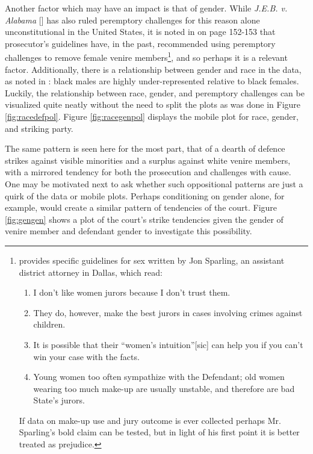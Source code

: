 Another factor which may have an impact is that of gender. While \textit{J.E.B. v. Alabama} [\cite{jebvalabama}] has also ruled
peremptory challenges for this reason alone unconstitutional in the United States, it is noted in \cite{vandykejurysel} on page
152-153 that prosecutor's guidelines have, in the past, recommended using peremptory challenges to remove female venire
members\footnote{\citeauthor{vandykejurysel} provides specific guidelines for sex written by Jon Sparling, an assistant district
  attorney in Dallas, which read: \begin{enumerate} 
  \item I don't like women jurors because I don't trust them.
  \item They do, however, make the best jurors in cases involving crimes against children.
  \item It is possible that their ``women's intuition''[sic] can help you if you can't win your case with the facts.
  \item Young women too often sympathize with the Defendant; old women wearing too much make-up are usually unstable, and
    therefore are bad State's jurors.
  \end{enumerate}
  If data on make-up use and jury outcome is ever collected perhaps Mr. Sparling's bold claim can be tested, but in light of
  his first point it is better treated as prejudice.}, and so perhaps it is a relevant factor. Additionally, there is a
relationship between gender and race in the data, as noted in \cite{JurySunshineProj}: black males are highly under-represented
relative to black females. Luckily, the relationship between race, gender, and peremptory challenges can be visualized quite
neatly without the need to split the plots as was done in Figure \ref{fig:racedefpol}. Figure \ref{fig:racegenpol} displays the
mobile plot for race, gender, and striking party.

The same pattern is seen here for the most part, that of a dearth of defence strikes against visible minorities and a surplus
against white venire members, with a mirrored tendency for both the prosecution and challenges with cause. One may be motivated
next to ask whether such oppositional patterns are just a quirk of the data or mobile plots. Perhaps conditioning on gender
alone, for example, would create a similar pattern of tendencies of the court. Figure \ref{fig:gengen} shows a plot of the court's
strike tendencies given the gender of venire member and defendant gender to investigate this possibility.

